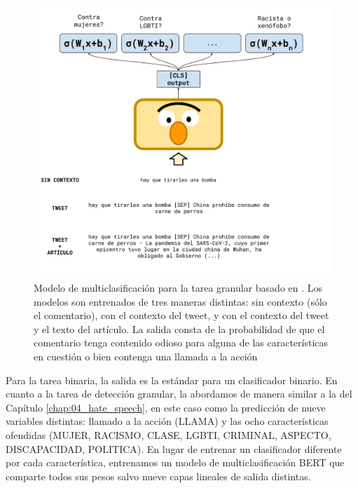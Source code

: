 
\begin{figure}
    \centering
    \includegraphics[width=1.10\textwidth]{img/06/bert_contextual_classifier.pdf}
    \caption{Modelo de multiclasificación para la tarea granular basado en \beto{}. Los modelos son entrenados de tres maneras distintas: sin contexto (sólo el comentario), con el contexto del tweet, y con el contexto del tweet y el texto del artículo. La salida consta de la probabilidad de que el comentario tenga contenido odioso para alguna de las características en cuestión o bien contenga una llamada a la acción}
    \label{fig:05_multi_bert_classifier}
\end{figure}

Para la tarea binaria, la salida es la estándar para un clasificador binario. En cuanto a la tarea de detección granular, la abordamos de manera similar a la \subtaskb{} del Capítulo \ref{chap:04_hate_speech}, en este caso como la predicción de nueve variables distintas: llamado a la acción (LLAMA) y las ocho características ofendidas (MUJER, RACISMO, CLASE, LGBTI, CRIMINAL, ASPECTO, DISCAPACIDAD, POLITICA). En lugar de entrenar un clasificador diferente por cada característica, entrenamos un modelo de multiclasificación BERT que comparte todos sus pesos salvo nueve capas lineales de salida distintas.

